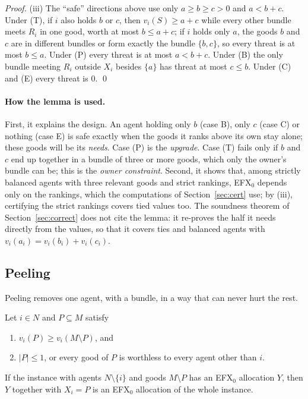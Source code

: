 \documentclass[runningheads,11pt]{llncs}
\newcommand{\efxz}{\texorpdfstring{\mbox{EFX$_0$}}{EFX0}}
\begin{document}
\begin{proof}
(iii) The ``safe'' directions above use only $a\ge b\ge c>0$ and $a<b+c$. Under (T), if $i$ also holds $b$ or $c$, then $v_i(S)\ge a+c$ while every other bundle meets $R_i$ in one good, worth at most $b\le a+c$; if $i$ holds only $a$, the goods $b$ and $c$ are in different bundles or form exactly the bundle $\{b,c\}$, so every threat is at most $b\le a$. Under (P) every threat is at most $a<b+c$. Under (B) the only bundle meeting $R_i$ outside $X_i$ besides $\{a\}$ has threat at most $c\le b$. Under (C) and (E) every threat is $0$. \qed
\end{proof}

\paragraph{How the lemma is used.} First, it explains the design. An agent holding only $b$ (case B), only $c$ (case C) or nothing (case E) is safe exactly when the goods it ranks above its own stay alone; these goods will be its \emph{needs}. Case (P) is the \emph{upgrade}. Case (T) fails only if $b$ and $c$ end up together in a bundle of three or more goods, which only the owner's bundle can be; this is the \emph{owner constraint}. Second, it shows that, among strictly balanced agents with three relevant goods and strict rankings, \efxz{} depends only on the rankings, which the computations of Section~\ref{sec:cert} use; by (iii), certifying the strict rankings covers tied values too. The soundness theorem of Section~\ref{sec:correct} does not cite the lemma: it re-proves the half it needs directly from the values, so that it covers ties and balanced agents with $v_i(a_i)=v_i(b_i)+v_i(c_i)$.

\subsection{Peeling}\label{sec:peel}

Peeling removes one agent, with a bundle, in a way that can never hurt the rest.

\begin{lemma}[peeling]\label{lem:peel}
Let $i\in N$ and $P\subseteq M$ satisfy
\begin{enumerate}
\item[(i)] $v_i(P)\ge v_i(M\setminus P)$, and
\item[(ii)] $|P|\le1$, or every good of $P$ is worthless to every agent other than $i$.
\end{enumerate}
If the instance with agents $N\setminus\{i\}$ and goods $M\setminus P$ has an \efxz{} allocation $Y$, then $Y$ together with $X_i=P$ is an \efxz{} allocation of the whole instance.
\end{lemma}
\end{document}

